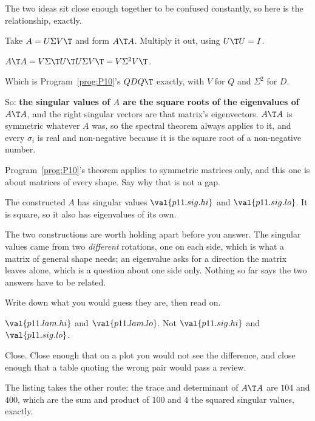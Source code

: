 \begin{fr}
The two ideas sit close enough together to be confused constantly, so here is
the relationship, exactly.

Take $A = U\Sigma V\T$ and form $A\T A$. Multiply it out, using
$U\T U = I$.
\dotline
\nextframe
\end{fr}

\begin{fr}
\begin{ansblock}
$A\T A = V\Sigma\T U\T U \Sigma V\T = V\Sigma^{2}V\T$.
\end{ansblock}

Which is Program~\ref{prog:P10}'s $QDQ\T$ exactly, with $V$ for $Q$ and
$\Sigma^{2}$ for $D$.

So: \textbf{the singular values of $A$ are the square roots of the eigenvalues
of $A\T A$}, and the right singular vectors are that matrix's eigenvectors.
$A\T A$ is symmetric whatever $A$ was, so the spectral theorem always applies
to it, and every $\sigma_i$ is real and non-negative because it is the square
root of a non-negative number.

Program~\ref{prog:P10}'s theorem applies to symmetric matrices only, and this
one is about matrices of every shape. Say why that is not a gap.
\dotline
\nextframe
\end{fr}

\begin{fr}
The constructed $A$ has singular values $\val{p11.sig.hi}$ and
$\val{p11.sig.lo}$. It is square, so it also has eigenvalues of its own.

The two constructions are worth holding apart before you answer. The singular
values came from two \emph{different} rotations, one on each side, which is
what a matrix of general shape needs; an eigenvalue asks for a direction the
matrix leaves alone, which is a question about one side only. Nothing so far
says the two answers have to be related.

Write down what you would guess they are, then read on.
\dotline
\nextframe
\end{fr}

\begin{fr}
\begin{ansblock}
$\val{p11.lam.hi}$ and $\val{p11.lam.lo}$. Not $\val{p11.sig.hi}$ and
$\val{p11.sig.lo}$.
\end{ansblock}

Close. Close enough that on a plot you would not see the difference, and close
enough that a table quoting the wrong pair would pass a review.


The listing takes the other route: the trace and determinant of $A\T A$ are
$104$ and $400$, which are the sum and product of $100$ and $4$ \dash{} the
squared singular values, exactly.
\end{fr}

